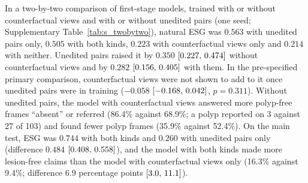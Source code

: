 In a two-by-two comparison of first-stage models, trained with or without counterfactual views and with or without unedited pairs (one seed; Supplementary Table~\ref{tab:s_twobytwo}), natural ESG was $0.563$ with unedited pairs only, $0.505$ with both kinds, $0.223$ with counterfactual views only and $0.214$ with neither. Unedited pairs raised it by $0.350$ $[0.227,\,0.474]$ without counterfactual views and by $0.282$ $[0.156,\,0.405]$ with them. In the pre-specified primary comparison, counterfactual views were not shown to add to it once unedited pairs were in training ($-0.058$ $[-0.168,\,0.042]$, $p = 0.311$). Without unedited pairs, the model with counterfactual views answered more polyp-free frames ``absent'' or referred (86.4\% against 68.9\%; a polyp reported on 3 against 27 of 103) and found fewer polyp frames (35.9\% against 52.4\%). On the main test, ESG was $0.744$ with both kinds and $0.260$ with unedited pairs only (difference $0.484$ $[0.408,\,0.558]$), and the model with both kinds made more lesion-free claims than the model with counterfactual views only (16.3\% against 9.4\%; difference 6.9 percentage points $[3.0,\,11.1]$).

